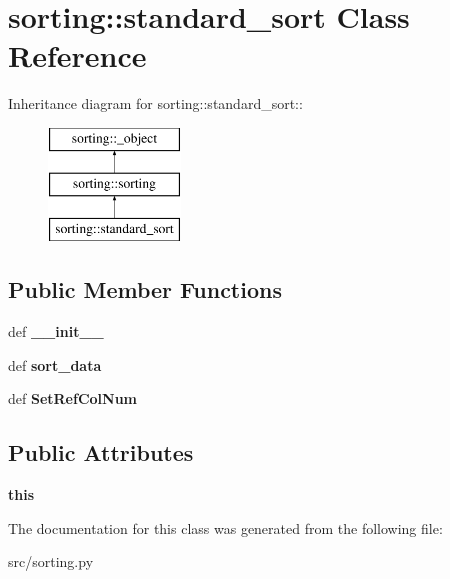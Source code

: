 \hypertarget{classsorting_1_1standard__sort}{
\section{sorting::standard\_\-sort Class Reference}
\label{d4/d39/classsorting_1_1standard__sort}
}
Inheritance diagram for sorting::standard\_\-sort::\begin{figure}[H]
\begin{center}
\leavevmode
\includegraphics[height=3cm]{d4/d39/classsorting_1_1standard__sort}
\end{center}
\end{figure}
\subsection*{Public Member Functions}
\begin{DoxyCompactItemize}
\item 
\hypertarget{classsorting_1_1standard__sort_ac29c41191d3be95569953afbdb59da3a}{
def {\bfseries \_\-\_\-init\_\-\_\-}}
\label{d4/d39/classsorting_1_1standard__sort_ac29c41191d3be95569953afbdb59da3a}

\item 
\hypertarget{classsorting_1_1standard__sort_a64f0375377b5e5d50001a4bab84bdd4d}{
def {\bfseries sort\_\-data}}
\label{d4/d39/classsorting_1_1standard__sort_a64f0375377b5e5d50001a4bab84bdd4d}

\item 
\hypertarget{classsorting_1_1standard__sort_ae1cbf3955b9ebd842e64266ec49b7456}{
def {\bfseries SetRefColNum}}
\label{d4/d39/classsorting_1_1standard__sort_ae1cbf3955b9ebd842e64266ec49b7456}

\end{DoxyCompactItemize}
\subsection*{Public Attributes}
\begin{DoxyCompactItemize}
\item 
\hypertarget{classsorting_1_1standard__sort_ac6fd3f180176bf5f8f3b2aed73833219}{
{\bfseries this}}
\label{d4/d39/classsorting_1_1standard__sort_ac6fd3f180176bf5f8f3b2aed73833219}

\end{DoxyCompactItemize}


The documentation for this class was generated from the following file:\begin{DoxyCompactItemize}
\item 
src/sorting.py\end{DoxyCompactItemize}
